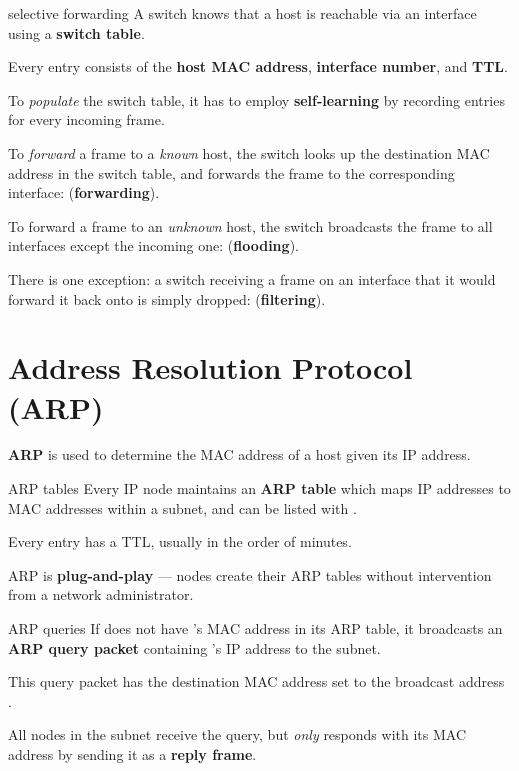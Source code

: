 \begin{defn}{selective forwarding}
    A switch knows that a host is reachable via an interface using a \textbf{switch table}.

    Every entry consists of the \textbf{host MAC address}, \textbf{interface number}, and \textbf{TTL}.

    To \textit{populate} the switch table, it has to employ \textbf{self-learning} by recording entries for every incoming frame.

    To \textit{forward} a frame to a \textit{known} host, the switch looks up the destination MAC address in the switch table,
    and forwards the frame to the corresponding interface: (\textbf{forwarding}).

    To forward a frame to an \textit{unknown} host, the switch broadcasts the frame to all interfaces except the incoming one: (\textbf{flooding}).

    There is one exception: a switch receiving a frame on an interface that it would forward it back onto is simply dropped: (\textbf{filtering}).
\end{defn}


\section{Address Resolution Protocol (ARP)}

\textbf{ARP} is used to determine the MAC address of a host given its IP address.

\begin{defn}{ARP tables}
    Every IP node maintains an \textbf{ARP table} which maps IP addresses to MAC addresses
    within a subnet, and can be listed with .

    Every entry has a TTL, usually in the order of minutes.
\end{defn}

ARP is \textbf{plug-and-play} --- nodes create their ARP tables without intervention from
a network administrator.

\begin{defn}{ARP queries}
    If  does not have 's MAC address in its ARP table, it broadcasts an \textbf{ARP query
    packet} containing 's IP address to the subnet.

    This query packet has the destination MAC address set to the broadcast address .

    All nodes in the subnet receive the query, but \textit{only}  responds with its MAC address
    by sending it as a \textbf{reply frame}.
\end{defn}

